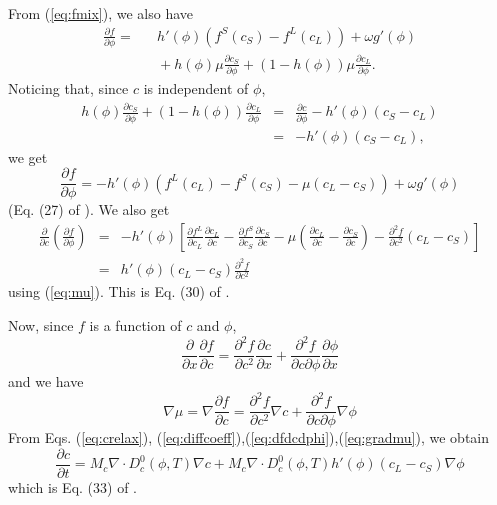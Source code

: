 From (\ref{eq:fmix}), we also have
%
\begin{eqnarray}
  \frac{\partial f}{\partial\phi} = & & h'(\phi)(f^S(c_S)-f^L(c_L))+
  \omega g'(\phi)
  \nonumber \\
  & & {} + h(\phi)\mu\frac{\partial c_S}{\partial\phi} +
  (1-h(\phi))\mu\frac{\partial c_L}{\partial\phi}.
\label{eq:dfdphi}
\end{eqnarray}
%
Noticing that, since $c$ is independent of $\phi$,
%
\begin{eqnarray}
  h(\phi)\frac{\partial c_S}{\partial\phi} +
  (1-h(\phi))\frac{\partial c_L}{\partial\phi} &=& \frac{\partial
  c}{\partial\phi} - h'(\phi)(c_S-c_L) \nonumber \\
  &=& - h'(\phi)(c_S-c_L),
\end{eqnarray}
%
we get
%
\begin{equation}
  \frac{\partial f}{\partial\phi} =
  - h'(\phi) \left( f^L(c_L) - f^S(c_S) - \mu (c_L - c_S) \right)
  + \omega g'(\phi)
\label{eq:dfdphi2}
\end{equation}
%
(Eq. (27) of \cite{PhysRevE.60.7186}). We also get
%
\begin{eqnarray}
  \frac{\partial}{\partial c}\left(\frac{\partial
  f}{\partial\phi}\right) &=& -h'(\phi) \left[\frac{\partial
  f^L}{\partial c_L}\frac{\partial c_L}{\partial c} - \frac{\partial
  f^S}{\partial c_S}\frac{\partial c_S}{\partial c}
  -\mu\left(\frac{\partial c_L}{\partial c}-\frac{\partial
  c_S}{\partial c}\right) - \frac{\partial^2 f}{\partial
  c^2}(c_L-c_S)\right] \nonumber \\ &=&
  h'(\phi)(c_L-c_S)\frac{\partial^2 f}{\partial c^2}
\label{eq:dfdcdphi}
\end{eqnarray}
%
using (\ref{eq:mu}). This is Eq. (30) of
\cite{PhysRevE.60.7186}.

Now, since $f$ is a function of $c$ and $\phi$,
%
\begin{equation}
  \frac{\partial}{\partial x}\frac{\partial f}{\partial c} =
  \frac{\partial^2 f}{\partial c^2}\frac{\partial c}{\partial x} +
  \frac{\partial^2 f}{\partial c
  \partial\phi}\frac{\partial\phi}{\partial x}
\end{equation}
%
and we have
%
\begin{equation}
  \nabla\mu = \nabla\frac{\partial f}{\partial c} = \frac{\partial^2
  f}{\partial c^2}\nabla c + \frac{\partial^2 f}{\partial
  c\partial\phi}\nabla\phi
\label{eq:gradmu}
\end{equation}
%
From Eqs. (\ref{eq:crelax}),
(\ref{eq:diffcoeff}),(\ref{eq:dfdcdphi}),(\ref{eq:gradmu}), we
obtain
%
\begin{equation}
  \frac{\partial c}{\partial t}
  =M_c\nabla\cdot D_c^0(\phi,T)\nabla c+ M_c\nabla\cdot
  D_c^0(\phi,T)h'(\phi)(c_L-c_S)\nabla\phi
\label{eq:ct}
\end{equation}
%
which is Eq. (33) of \cite{PhysRevE.60.7186}.

